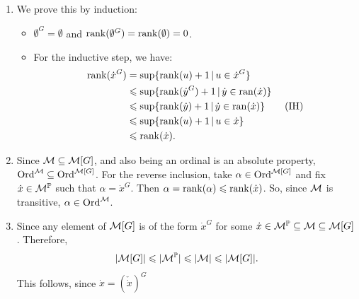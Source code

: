 \documentclass{article}
\begin{document}
\proof \hspace{0.1cm} \begin{enumerate}
    \item[(i)] We prove this by induction: \begin{itemize}
              \item $\emptyset^{G}=\emptyset$ and $\rank(\emptyset^{G})=\rank(\emptyset)=0$.
              \item For the inductive step, we have: \begin{align*}
                        \rank(\dot{x}^{G}) & =\sup\{ \rank(u) + 1 \, | \, u \in \dot{x}^{G}\}                         \\
                                           & \leqslant \sup\{\rank(\dot{y}^{G}) + 1 \, | \, \dot{y} \in \operatorname{ran}(\dot{x})\}    \\
                                           & \leqslant \sup\{\rank(\dot{y})+1 \, | \, \dot{y} \in \operatorname{ran}(\dot{x})\} \tag{IH} \\
                                           & \leqslant \sup\{\rank(u)+1 \, | \, u \in \dot{x}\}                            \\
                                           & \leqslant \rank(\dot{x}).
                    \end{align*}
          \end{itemize}
    \item[(ii)] Since $\mathcal{M} \subseteq \mathcal{M}[G]$, and also being an ordinal is an absolute property, $\operatorname{Ord}^{\mathcal{M}} \subseteq \operatorname{Ord}^{\mathcal{M}[G]}$. For the reverse inclusion, take $\alpha \in \operatorname{Ord}^{\mathcal{M}[G]}$ and fix $\dot{x} \in \mathcal{M}^{\mathbb{P}}$ such that $\alpha = \dot{x}^{G}$. Then $\alpha = \rank(\alpha) \leqslant \rank(\dot{x})$. So, since $\mathcal{M}$ is transitive, $\alpha \in \operatorname{Ord}^{\mathcal{M}}$.
    \item[(iii)] Since any element of $\mathcal{M}[G]$ is of the form $\dot{x}^{G}$ for some $\dot{x} \in \mathcal{M}^{\mathbb{P}} \subseteq \mathcal{M} \subseteq \mathcal{M}[G]$. Therefore, \[ |\mathcal{M}[G]| \leqslant |\mathcal{M}^{\mathbb{P}}| \leqslant |\mathcal{M}| \leqslant |\mathcal{M}[G]|.\]
          This follows, since $\dot{x} = (\check{\dot{x}})^{G}$
\end{enumerate}
\endproof
\end{document}
